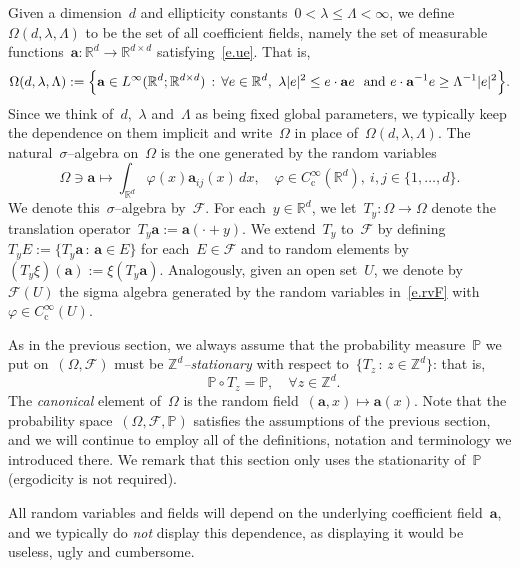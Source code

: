 \documentclass[11pt,twoside]{article} %
\numberwithin{equation}{section}
\theoremstyle{definition}
\newcommand*{\R}{\ensuremath{\mathbb{R}}}
\newcommand*{\Zd}{\ensuremath{\mathbb{Z}^d}}
\newcommand*{\Rd}{\ensuremath{\mathbb{R}^d}}
\renewcommand{\a}{\mathbf{a}}
\newcommand{\F}{\mathcal{F}}
\renewcommand{\P}{\mathbb{P}}
\begin{document}
Given a dimension~$d$ and ellipticity constants~$0 < \lambda\leq \Lambda <\infty$, we define~$\Omega(d,\lambda,\Lambda)$ to be the set of all coefficient fields, namely the set of measurable functions~$\a:\Rd \to \R^{d\times d}$ satisfying~\eqref{e.ue}. That is, 
\begin{equation}
\label{e.Omega.dLambda}
\Omega(d,\lambda,\Lambda) : = 
\Bigl\{
\a \in L^\infty(\Rd;\R^{d\times d}) \,:\, \forall e \in\Rd, \ 
\lambda |e|^2 \leq e\cdot \a  e \ \ \mbox{and}
\ 
e \cdot \a^{-1} e 
\geq \Lambda^{-1}  |e|^2 
 \Bigr\}.
\end{equation}
Since we think of~$d$,~$\lambda$ and~$\Lambda$ as being fixed global parameters, we typically keep the dependence on them implicit and write~$\Omega$ in place of~$\Omega(d,\lambda,\Lambda)$. 
The natural~$\sigma$--algebra on~$\Omega$ is the one generated by the random variables 
\begin{equation}
\label{e.rvF}
\Omega \ni \a  \mapsto \int_{\Rd} \varphi(x)\a_{ij}(x)\,dx, \quad \varphi\in C^\infty_{\mathrm{c}}(\Rd), \ i,j\in\{1,\ldots,d\}.
\end{equation}
We denote this~$\sigma$--algebra by~$\F$. 
For each~$y\in\Rd$, we let~$T_y:\Omega \to \Omega$ denote the translation operator~$T_y\a := \a(\cdot+y)$.
We extend~$T_y$ to~$\F$ by defining~$T_y E := \{ T_y\a \,:\,\a\in E\}$ for each~$E\in\F$ and to random elements by~$(T_y\xi)(\a) := \xi(T_y\a)$. Analogously, given an open set~$U$, we denote by~$\mathcal{F}(U)$ the sigma algebra generated by the random variables in~\eqref{e.rvF} with~$\varphi \in C^\infty_{\mathrm{c}}(U)$. 

\smallskip

As in the previous section, we always assume that the probability measure~$\P$ we put on~$(\Omega,\F)$ must be \emph{$\Zd$--stationary} with respect to~$\{ T_z \,:\, z\in \Zd\}$:
that is, 
\begin{equation}
\label{e.Zdstat1}
\qquad
\P \circ T_z  = \P, \quad \forall z\in\Zd.
\end{equation}
The \emph{canonical} element of~$\Omega$ is the random field~$(\a,x) \mapsto \a(x)$. Note that the probability space~$(\Omega,\F,\P)$ satisfies the assumptions of the previous section, and we will continue to employ all of the definitions, notation and terminology we introduced there.
We remark that this section only uses the stationarity of~$\P$ (ergodicity is not required).

\smallskip

All random variables and fields will depend on the underlying coefficient field~$\a$, and we typically do \emph{not} display this dependence, as displaying it would be useless, ugly and cumbersome. 
\end{document}
